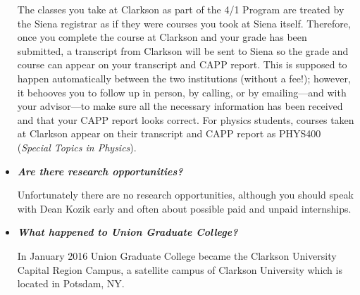 \documentclass[12pt]{article}
\begin{document}
\begin{itemize}
{The classes you take at Clarkson as part of the 4/1 Program are treated by the
Siena registrar as if they were courses you took at Siena itself.  Therefore,
once you complete the course at Clarkson and your grade has been submitted, a
transcript from Clarkson will be sent to Siena so the grade and course can
appear on your transcript and CAPP report.  This is supposed to happen
automatically between the two institutions (without a fee!); however, it
behooves you to follow up in person, by calling, or by emailing---and with your
advisor---to make sure all the necessary information has been received and that
your CAPP report looks correct.  For physics students, courses taken at Clarkson
appear on their transcript and CAPP report as PHYS400 ({\em Special Topics in
  Physics}).}

\item{{\bf {\em Are there research opportunities?}}

Unfortunately there are no research opportunities, although you should speak
with Dean Kozik early and often about possible paid and unpaid internships.}



\item{{\bf {\em What happened to Union Graduate College?}}

In January 2016 Union Graduate College became the Clarkson University Capital
Region Campus, a satellite campus of Clarkson University which is located in
Potsdam, NY.}
  
\end{itemize}
  
\end{document}
